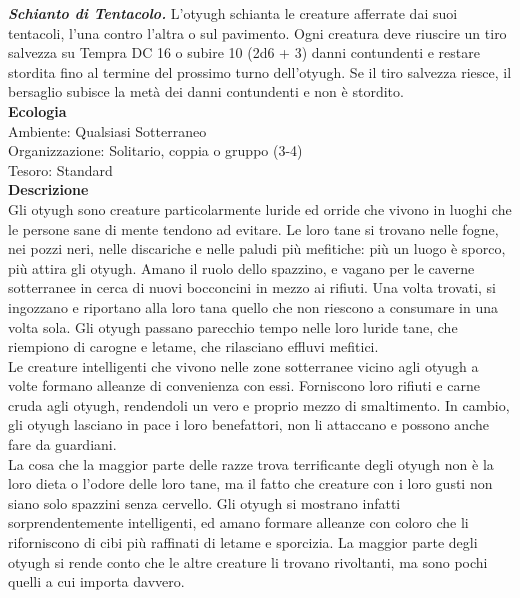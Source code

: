 \begin{multicols}{2}
\emph{\textbf{Schianto di Tentacolo.}} L'otyugh schianta le creature afferrate dai suoi tentacoli, l'una contro l'altra o sul pavimento. Ogni creatura deve riuscire un tiro salvezza su Tempra DC  16 o subire 10 (2d6 + 3) danni contundenti e restare stordita fino al termine del prossimo turno dell'otyugh. Se il tiro salvezza riesce, il bersaglio subisce la metà dei danni contundenti e non è stordito.\\
\textbf{Ecologia}\\
Ambiente: Qualsiasi Sotterraneo\\
Organizzazione: Solitario, coppia o gruppo (3-4)\\
Tesoro: Standard\\
\textbf{Descrizione}\\
Gli otyugh sono creature particolarmente luride ed orride che vivono in luoghi che le persone sane di mente tendono ad evitare. Le loro tane si trovano nelle fogne, nei pozzi neri, nelle discariche e nelle paludi più mefitiche: più un luogo è sporco, più attira gli otyugh. Amano il ruolo dello spazzino, e vagano per le caverne sotterranee in cerca di nuovi bocconcini in mezzo ai rifiuti. Una volta trovati, si ingozzano e riportano alla loro tana quello che non riescono a consumare in una volta sola. Gli otyugh passano parecchio tempo nelle loro luride tane, che riempiono di carogne e letame, che rilasciano effluvi mefitici.\\
Le creature intelligenti che vivono nelle zone sotterranee vicino agli otyugh a volte formano alleanze di convenienza con essi. Forniscono loro rifiuti e carne cruda agli otyugh, rendendoli un vero e proprio mezzo di smaltimento. In cambio, gli otyugh lasciano in pace i loro benefattori, non li attaccano e possono anche fare da guardiani.\\
La cosa che la maggior parte delle razze trova terrificante degli otyugh non è la loro dieta o l’odore delle loro tane, ma il fatto che creature con i loro gusti non siano solo spazzini senza cervello. Gli otyugh si mostrano infatti sorprendentemente intelligenti, ed amano formare alleanze con coloro che li riforniscono di cibi più raffinati di letame e sporcizia. La maggior parte degli otyugh si rende conto che le altre creature li trovano rivoltanti, ma sono pochi quelli a cui importa davvero.\\


\end{multicols}

